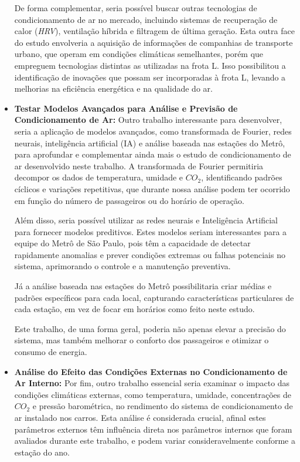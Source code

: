 \documentclass[acronym,symbols,table]{fei}
\begin{document}
\begin{itemize}[label=\arabic*.]
De forma complementar, seria possível buscar outras tecnologias de condicionamento de ar no mercado, incluindo sistemas de recuperação de calor (\textit{HRV}), ventilação híbrida e filtragem de última geração. Esta outra face do estudo envolveria a aquisição de informações de companhias de transporte urbano, que operam em condições climáticas semelhantes, porém que empreguem tecnologias distintas as utilizadas na frota L. Isso possibilitou a identificação de inovações que possam ser incorporadas à frota L, levando a melhorias na eficiência energética e na qualidade do ar. 

\item \textbf{Testar Modelos Avançados para Análise e Previsão de Condicionamento de Ar:} Outro trabalho interessante para desenvolver, seria a aplicação de modelos avançados, como transformada de Fourier, redes neurais, inteligência artificial (IA) e análise baseada nas estações do Metrô, para aprofundar e complementar ainda mais o estudo de condicionamento de ar desenvolvido neste trabalho. A transformada de Fourier permitiria decompor os dados de temperatura, umidade e ${CO}_{2}$, identificando padrões cíclicos e variações repetitivas, que durante nossa análise podem ter ocorrido em função do número de passageiros ou do horário de operação.

Além disso, seria possível utilizar as redes neurais e Inteligência Artificial para fornecer modelos preditivos. Estes modelos seriam interessantes para a equipe do Metrô de São Paulo, pois têm a capacidade de detectar rapidamente anomalias e prever condições extremas ou falhas potenciais no sistema, aprimorando o controle e a manutenção preventiva.

Já a análise baseada nas estações do Metrô possibilitaria criar médias e padrões específicos para cada local, capturando características particulares de cada estação, em vez de focar em horários como feito neste estudo.

Este trabalho, de uma forma geral, poderia não apenas elevar a precisão do sistema, mas também melhorar o conforto dos passageiros e otimizar o consumo de energia.  

\item \textbf{Análise do Efeito das Condições Externas no Condicionamento de Ar Interno:} Por fim, outro trabalho essencial seria examinar o impacto das condições climáticas externas, como temperatura, umidade, concentrações de ${CO}_{2}$ e pressão barométrica, no rendimento do sistema de condicionamento de ar instalado nos carros. Esta análise é considerada crucial, afinal estes parâmetros externos têm influência direta nos parâmetros internos que foram avaliados durante este trabalho, e podem variar consideravelmente conforme a estação do ano.


\end{itemize}
\end{document}

